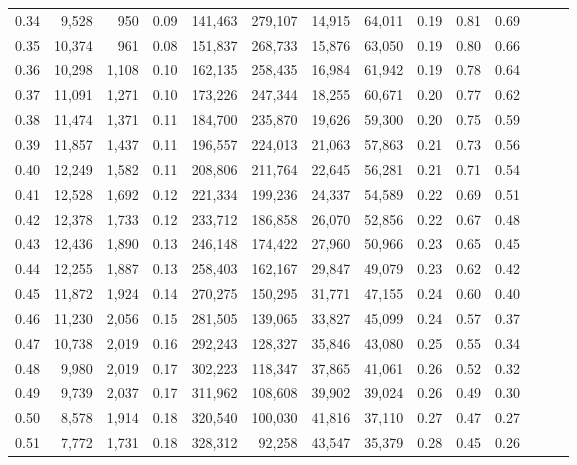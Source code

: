 \begin{tabular}{rrrrrrrrrrrrrr}
0.34 &   9,528 &    950 &  0.09 &  141,463 &  279,107 &  14,915 &  64,011 &  0.19 &  0.81 &      0.69 \\
0.35 &  10,374 &    961 &  0.08 &  151,837 &  268,733 &  15,876 &  63,050 &  0.19 &  0.80 &      0.66 \\
0.36 &  10,298 &  1,108 &  0.10 &  162,135 &  258,435 &  16,984 &  61,942 &  0.19 &  0.78 &      0.64 \\
0.37 &  11,091 &  1,271 &  0.10 &  173,226 &  247,344 &  18,255 &  60,671 &  0.20 &  0.77 &      0.62 \\
0.38 &  11,474 &  1,371 &  0.11 &  184,700 &  235,870 &  19,626 &  59,300 &  0.20 &  0.75 &      0.59 \\
0.39 &  11,857 &  1,437 &  0.11 &  196,557 &  224,013 &  21,063 &  57,863 &  0.21 &  0.73 &      0.56 \\
0.40 &  12,249 &  1,582 &  0.11 &  208,806 &  211,764 &  22,645 &  56,281 &  0.21 &  0.71 &      0.54 \\
0.41 &  12,528 &  1,692 &  0.12 &  221,334 &  199,236 &  24,337 &  54,589 &  0.22 &  0.69 &      0.51 \\
0.42 &  12,378 &  1,733 &  0.12 &  233,712 &  186,858 &  26,070 &  52,856 &  0.22 &  0.67 &      0.48 \\
0.43 &  12,436 &  1,890 &  0.13 &  246,148 &  174,422 &  27,960 &  50,966 &  0.23 &  0.65 &      0.45 \\
0.44 &  12,255 &  1,887 &  0.13 &  258,403 &  162,167 &  29,847 &  49,079 &  0.23 &  0.62 &      0.42 \\
0.45 &  11,872 &  1,924 &  0.14 &  270,275 &  150,295 &  31,771 &  47,155 &  0.24 &  0.60 &      0.40 \\
0.46 &  11,230 &  2,056 &  0.15 &  281,505 &  139,065 &  33,827 &  45,099 &  0.24 &  0.57 &      0.37 \\
0.47 &  10,738 &  2,019 &  0.16 &  292,243 &  128,327 &  35,846 &  43,080 &  0.25 &  0.55 &      0.34 \\
0.48 &   9,980 &  2,019 &  0.17 &  302,223 &  118,347 &  37,865 &  41,061 &  0.26 &  0.52 &      0.32 \\
0.49 &   9,739 &  2,037 &  0.17 &  311,962 &  108,608 &  39,902 &  39,024 &  0.26 &  0.49 &      0.30 \\
0.50 &   8,578 &  1,914 &  0.18 &  320,540 &  100,030 &  41,816 &  37,110 &  0.27 &  0.47 &      0.27 \\
0.51 &   7,772 &  1,731 &  0.18 &  328,312 &   92,258 &  43,547 &  35,379 &  0.28 &  0.45 &      0.26 \\

\end{tabular}
